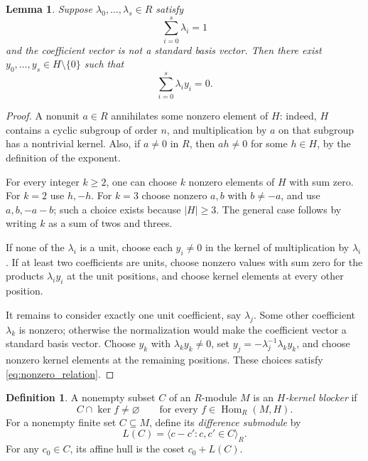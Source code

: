 \documentclass[11pt,reqno]{amsart}
\newtheorem{lemma}[theorem]{Lemma}
\theoremstyle{definition}
\newtheorem{definition}[theorem]{Definition}
\numberwithin{equation}{section}
\newcommand{\Hom}{\operatorname{Hom}}
\renewcommand{\geq}{\geqslant}
\begin{document}
\begin{lemma}\label{lem:nonzero}
Suppose $\lambda_0,\ldots,\lambda_s\in R$ satisfy
\[
 \sum_{i=0}^{s}\lambda_i=1
\]
and the coefficient vector is not a standard basis vector. Then there exist $y_0,\ldots,y_s\in H\setminus\{0\}$ such that
\begin{equation}\label{eq:nonzero_relation}
 \sum_{i=0}^{s}\lambda_i y_i=0.
\end{equation}
\end{lemma}
\begin{proof}
A nonunit $a\in R$ annihilates some nonzero element of $H$: indeed, $H$ contains a cyclic subgroup of order $n$, and multiplication by $a$ on that subgroup has a nontrivial kernel. Also, if $a\ne 0$ in $R$, then $ah\ne 0$ for some $h\in H$, by the definition of the exponent.

For every integer $k\geq 2$, one can choose $k$ nonzero elements of $H$ with sum zero. For $k=2$ use $h,-h$. For $k=3$ choose nonzero $a,b$ with $b\ne-a$, and use $a,b,-a-b$; such a choice exists because $|H|\geq 3$. The general case follows by writing $k$ as a sum of twos and threes.

If none of the $\lambda_i$ is a unit, choose each $y_i\ne 0$ in the kernel of multiplication by $\lambda_i$. If at least two coefficients are units, choose nonzero values with sum zero for the products $\lambda_i y_i$ at the unit positions, and choose kernel elements at every other position.

It remains to consider exactly one unit coefficient, say $\lambda_j$. Some other coefficient $\lambda_k$ is nonzero; otherwise the normalization would make the coefficient vector a standard basis vector. Choose $y_k$ with $\lambda_k y_k\ne 0$, set $y_j=-\lambda_j^{-1}\lambda_k y_k$, and choose nonzero kernel elements at the remaining positions. These choices satisfy \eqref{eq:nonzero_relation}.
\end{proof}

\begin{definition}
A nonempty subset $C$ of an $R$-module $M$ is an \emph{$H$-kernel blocker} if
\[
 C\cap\ker f\ne\varnothing\qquad\text{for every }f\in\Hom_R(M,H).
\]
For a nonempty finite set $C\subseteq M$, define its \emph{difference submodule} by
\[
 L(C)=\langle c-c':c,c'\in C\rangle_R.
\]
For any $c_0\in C$, its affine hull is the coset $c_0+L(C)$.
\end{definition}
\end{document}

